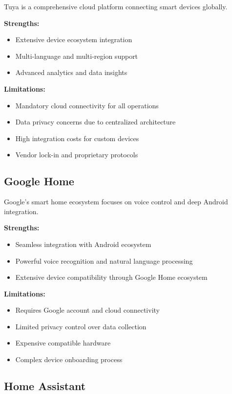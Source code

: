 Tuya is a comprehensive cloud platform connecting smart devices globally.

\textbf{Strengths:}
\begin{itemize}
    \item Extensive device ecosystem integration
    \item Multi-language and multi-region support
    \item Advanced analytics and data insights
\end{itemize}

\textbf{Limitations:}
\begin{itemize}
    \item Mandatory cloud connectivity for all operations
    \item Data privacy concerns due to centralized architecture
    \item High integration costs for custom devices
    \item Vendor lock-in and proprietary protocols
\end{itemize}

\subsection{Google Home}

Google's smart home ecosystem focuses on voice control and deep Android integration.

\textbf{Strengths:}
\begin{itemize}
    \item Seamless integration with Android ecosystem
    \item Powerful voice recognition and natural language processing
    \item Extensive device compatibility through Google Home ecosystem
\end{itemize}

\textbf{Limitations:}
\begin{itemize}
    \item Requires Google account and cloud connectivity
    \item Limited privacy control over data collection
    \item Expensive compatible hardware
    \item Complex device onboarding process
\end{itemize}

\subsection{Home Assistant}

